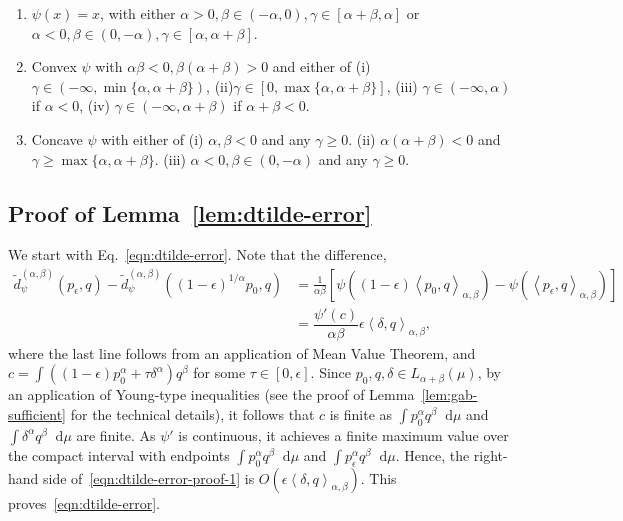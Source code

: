 \documentclass[11pt]{article}
\theoremstyle{plain}
\theoremstyle{remark}
\newcommand{\dd}{\mathop{}\!\mathrm{d}}
\newcommand{\inner}[1]{\left\langle #1\right\rangle}
\begin{document}
\begin{enumerate}
    \item $\psi(x) = x$, with either $\alpha > 0, \beta \in (-\alpha, 0), \gamma \in [\alpha+\beta, \alpha]$ or $\alpha < 0, \beta \in (0, -\alpha), \gamma \in [\alpha, \alpha+\beta]$.
    \item Convex $\psi$ with $\alpha\beta < 0, \beta(\alpha+\beta) > 0$ and either of (i) $\gamma \in (-\infty, \min\{\alpha,\alpha+\beta\})$, (ii)$\gamma \in [0, \max\{\alpha, \alpha+\beta\}]$, (iii) $\gamma \in (-\infty, \alpha)$ if $\alpha < 0$, (iv) $\gamma \in (-\infty, \alpha +\beta)$ if $\alpha+\beta < 0$.
    \item Concave $\psi$ with either of (i) $\alpha, \beta < 0$ and any $\gamma \geq 0$. (ii) $\alpha(\alpha+\beta) < 0$ and $\gamma \geq \max\{\alpha, \alpha+\beta\}$. (iii) $\alpha < 0, \beta \in (0, -\alpha)$ and any $\gamma \geq 0$.
\end{enumerate}

\subsection{Proof of Lemma~\ref{lem:dtilde-error}}\label{appendix-proof:lem-dtilde-error}

We start with Eq.~\eqref{eqn:dtilde-error}. Note that the difference,
\begin{align}
    \tilde{d}_{\psi}^{(\alpha,\beta)}(p_\epsilon, q)
    - \tilde{d}_{\psi}^{(\alpha,\beta)}((1-\epsilon)^{1/\alpha} p_0, q)
     & = \frac{1}{\alpha\beta}\left[ \psi\left( (1-\epsilon)\inner{p_0,q}_{\alpha,\beta} \right) - \psi\left( \inner{p_\epsilon,q}_{\alpha,\beta} \right) \right]\nonumber \\
     & = \dfrac{\psi'(c)}{\alpha\beta} \epsilon \inner{\delta, q}_{\alpha,\beta},
    \label{eqn:dtilde-error-proof-1}
\end{align}
\noindent where the last line follows from an application of Mean Value Theorem, and $c = \int ((1-\epsilon)p_0^\alpha + \tau \delta^\alpha)q^\beta$ for some $\tau \in [0, \epsilon]$. Since $p_0, q, \delta \in L_{\alpha+\beta}(\mu)$, by an application of Young-type inequalities (see the proof of Lemma~\ref{lem:gab-sufficient} for the technical details), it follows that $c$ is finite as $\int p_0^\alpha q^\beta \dd\mu$ and $\int \delta^\alpha q^\beta \dd\mu$ are finite. As $\psi'$ is continuous, it achieves a finite maximum value over the compact interval with endpoints $\int p_0^\alpha q^\beta \dd\mu$ and $\int p_\epsilon^\alpha q^\beta \dd\mu$. Hence, the right-hand side of~\eqref{eqn:dtilde-error-proof-1} is $O(\epsilon \inner{\delta,q}_{\alpha,\beta})$. This proves~\eqref{eqn:dtilde-error}.
\end{document}

